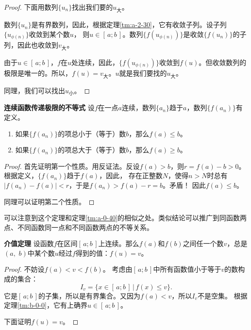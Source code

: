 \documentclass[12pt,UTF8,fontset=none]{ctexbook}
\begin{document}
\begin{appendix}
\begin{proof}
    下面用数列$\{u_n\}$找出我们要的$u_{\text{大}}$。

    数列$\{u_n\}$是有界数列，因此，根据定理\ref{tm:a-2-30}，它有收敛子列。设子列$\{u_{\phi(n)}\}$收敛到某个数$u$，
    则$u\in[\,a;b\,]$。数列$\{f(u_{\phi(n)})\}$是收敛$\{f(u_n)\}$的子列，因此也收敛到$v_{\text{大}}$。

    由于$u\in[\,a;b\,]$，$f$在$u$处连续，因此，$\{f(u_{\phi(n)})\}$收敛到$f(u)$。但收敛数列的极限是唯一的。所以，$f(u) = v_{\text{大}}$。$u$就是我们要找的$u_{\text{大}}$。

    同理，我们可以找出$u_{\text{小}}$。
\end{proof}

\begin{tm}{\textbf{连续函数传递极限的不等式}}\label{tm:b-1-10}
    设$f$在一点$a$连续，数列$\{a_n\}$趋于$a$，数列$\{f(a_n)\}$有定义。
    \begin{enumerate}
        \item 如果$\{f(a_n)\}$的项总小于（等于）数$b$，那么$f(a)\leqslant b$。
        \item 如果$\{f(a_n)\}$的项总大于（等于）数$b$，那么$f(a)\geqslant b$。
    \end{enumerate}
\end{tm}
\begin{proof}
    首先证明第一个性质。用反证法。反设$f(a) > b$，则$r = f(a) - b > 0$。根据定义，$\{f(a_n)\}$趋于$f(a)$，因此，
    存在正整数$N$，使得$n>N$时总有$|f(a_n) - f(a)| < r$，于是$f(a_n) > f(a) - r = b$。矛盾！
    因此$f(a)\leqslant b$。

    同理可以证明第二个性质。
\end{proof}

可以注意到这个定理和定理\ref{tm:a-0-40}的相似之处。类似结论可以推广到同函数两点、不同函数同一点和不同函数两点的不等关系。

\begin{tm}{\textbf{介值定理}}\label{tm:b-1-20}
    设函数$f$在区间$[\,a;b\,]$上连续。那么$f(a)$和$f(b)$之间任一个数$v$，总是$(a, \,\,b)$中某个数$u$经过$f$得到的值：$f(u) = v$。
\end{tm}
\begin{proof}
    不妨设$f(a) < v < f(b)$。
    考虑由$[\,a;b\,]$中所有函数值小于等于$v$的数构成的集合：
    $$I_v = \{ x \in [\,a;b\,] \, | \, f(x) \leqslant v\}.$$
    它是$[\,a;b\,]$的子集，所以是有界集合。又因为$f(a) < v$，所以$I_v$不是空集。
    根据定理\ref{tm:b-0-0}，它有上确界$u\in[\,a;b\,]$。

    下面证明$f(u) = v$。


\end{proof}
\end{appendix}
\end{document}
